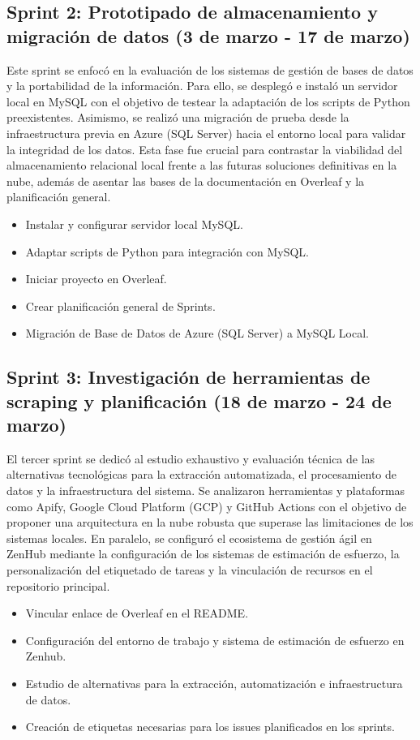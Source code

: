 \subsection{Sprint 2: Prototipado de almacenamiento y migración de datos (3 de marzo - 17 de marzo)}
Este sprint se enfocó en la evaluación de los sistemas de gestión de bases de datos y la portabilidad de la información. Para ello, se desplegó e instaló un servidor local en MySQL con el objetivo de testear la adaptación de los scripts de Python preexistentes. Asimismo, se realizó una migración de prueba desde la infraestructura previa en Azure (SQL Server) hacia el entorno local para validar la integridad de los datos. Esta fase fue crucial para contrastar la viabilidad del almacenamiento relacional local frente a las futuras soluciones definitivas en la nube, además de asentar las bases de la documentación en Overleaf y la planificación general.

\begin{itemize}
    \item Instalar y configurar servidor local MySQL.
    \item Adaptar scripts de Python para integración con MySQL.
    \item Iniciar proyecto en Overleaf.
    \item Crear planificación general de Sprints.
    \item Migración de Base de Datos de Azure (SQL Server) a MySQL Local.
\end{itemize}

\subsection{Sprint 3: Investigación de herramientas de scraping y planificación (18 de marzo - 24 de marzo)}
El tercer sprint se dedicó al estudio exhaustivo y evaluación técnica de las alternativas tecnológicas para la extracción automatizada, el procesamiento de datos y la infraestructura del sistema. Se analizaron herramientas y plataformas como Apify, Google Cloud Platform (GCP) y GitHub Actions con el objetivo de proponer una arquitectura en la nube robusta que superase las limitaciones de los sistemas locales. En paralelo, se configuró el ecosistema de gestión ágil en ZenHub mediante la configuración de los sistemas de estimación de esfuerzo, la personalización del etiquetado de tareas y la vinculación de recursos en el repositorio principal.

\begin{itemize}
    \item Vincular enlace de Overleaf en el README.
    \item Configuración del entorno de trabajo y sistema de estimación de esfuerzo en Zenhub.
    \item Estudio de alternativas para la extracción, automatización e infraestructura de datos.
    \item Creación de etiquetas necesarias para los issues planificados en los sprints.
\end{itemize}

